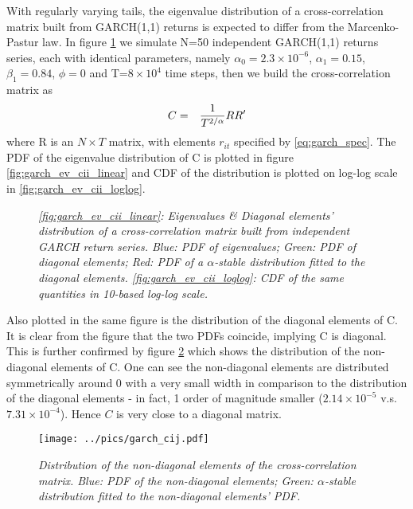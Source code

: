 With regularly varying tails, the eigenvalue distribution of a
cross-correlation matrix built from GARCH(1,1) returns is expected to
differ from the Marcenko-Pastur law. In figure
\ref{fig:garch_ev_cii} we simulate N=50 independent GARCH(1,1)
returns series, each with identical parameters, namely $\alpha_0 =
2.3\times 10^{-6}$, $\alpha_1 = 0.15$, $\beta_1 = 0.84$, $\phi = 0$
and T=$8\times10^4$ time steps, then we build the cross-correlation
matrix as
\begin{eqnarray*}
  C &=& {1 \over T^{2/\alpha}} RR'
\end{eqnarray*}
where R is an $N\times T$ matrix, with elements $r_{it}$ specified by
\ref{eq:garch_spec}. The PDF of the eigenvalue distribution of C is
plotted in figure \ref{fig:garch_ev_cii_linear} and CDF of the
distribution is plotted on log-log scale in
\ref{fig:garch_ev_cii_loglog}.
\begin{figure}[htb!]
  \centering
  \caption{\small \it \ref{fig:garch_ev_cii_linear}: Eigenvalues \&
    Diagonal elements' distribution of a cross-correlation matrix
    built from independent GARCH return series. Blue: PDF of
    eigenvalues; Green: PDF of diagonal elements; Red: PDF of a
    $\alpha$-stable distribution fitted to the diagonal
    elements. \ref{fig:garch_ev_cii_loglog}: CDF of the same
    quantities in 10-based log-log scale.}
  \label{fig:garch_ev_cii}
\end{figure}
Also plotted in the same figure is the distribution of the diagonal
elements of C. It is clear from the figure that the two PDFs coincide,
implying C is diagonal. This is further confirmed by figure
\ref{fig:garch_cij} which shows the distribution of the non-diagonal
elements of C. One can see the non-diagonal elements are distributed
symmetrically around 0 with a very small width in comparison to the
distribution of the diagonal elements - in fact, 1 order of magnitude
smaller ($2.14\times10^{-5}$ v.s. $7.31\times 10^{-4}$). Hence $C$ is
very close to a diagonal matrix.
\begin{figure}[htb!]
  \centering
    \texttt{[image: ../pics/garch\_cij.pdf]}
  \caption{\small \it Distribution of the non-diagonal elements of
    the cross-correlation matrix. Blue: PDF of the non-diagonal
    elements; Green: $\alpha$-stable distribution fitted to the
    non-diagonal elements' PDF.}
  \label{fig:garch_cij}
\end{figure}


